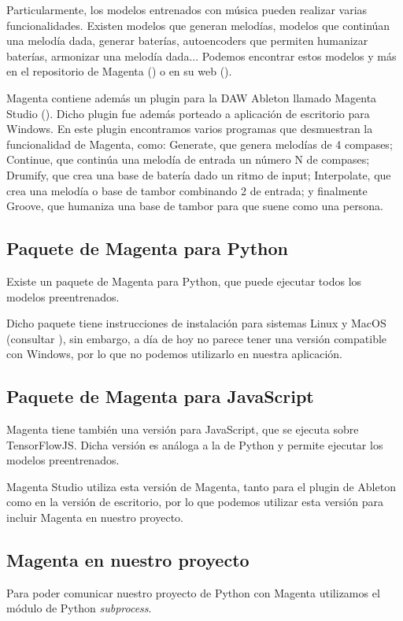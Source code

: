     Particularmente, los modelos entrenados con música pueden realizar varias funcionalidades. Existen modelos que generan melodías, modelos que continúan una melodía dada, generar baterías, autoencoders que permiten humanizar baterías, armonizar una melodía dada... Podemos encontrar estos modelos y más en el repositorio de Magenta (\cite{MagentaRepo}) o en su web (\cite{MagentaWeb}).

    Magenta contiene además un plugin para la DAW Ableton llamado Magenta Studio (\cite{MagentaStudio}). Dicho plugin fue además porteado a aplicación de escritorio para Windows. En este plugin encontramos varios programas que desmuestran la funcionalidad de Magenta, como: Generate, que genera melodías de 4 compases; Continue, que continúa una melodía de entrada un número N de compases; Drumify, que crea una base de batería dado un ritmo de input; Interpolate, que crea una melodía o base de tambor combinando 2 de entrada; y finalmente Groove, que humaniza una base de tambor para que suene como una persona.
    
    \subsection{Paquete de Magenta para Python}
    \label{subsec:magentaPython}
    Existe un paquete de Magenta para Python, que puede ejecutar todos los modelos preentrenados.

    Dicho paquete tiene instrucciones de instalación para sistemas Linux y MacOS (consultar \cite{MagentaRepo}), sin embargo, a día de hoy no parece tener una versión compatible con Windows, por lo que no podemos utilizarlo en nuestra aplicación.

    \subsection{Paquete de Magenta para JavaScript}
    \label{subsec:magentaJS}
    Magenta tiene también una versión para JavaScript, que se ejecuta sobre TensorFlowJS. Dicha versión es análoga a la de Python y permite ejecutar los modelos preentrenados.

    Magenta Studio utiliza esta versión de Magenta, tanto para el plugin de Ableton como en la versión de escritorio, por lo que podemos utilizar esta versión para incluir Magenta en nuestro proyecto.

    \subsection{Magenta en nuestro proyecto}
    \label{subsec:magentaEnNuestroProyecto}
    Para poder comunicar nuestro proyecto de Python con Magenta utilizamos el módulo de Python \textit{subprocess}.

